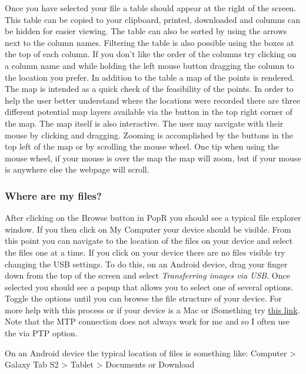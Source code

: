 \documentclass[
]{book}
\begin{document}
Once you have selected your file a table should appear at the right of the screen. This table can be copied to your clipboard, printed, downloaded and columns can be hidden for easier viewing. The table can also be sorted by using the arrows next to the column names. Filtering the table is also possible using the boxes at the top of each column. If you don't like the order of the columns try clicking on a column name and while holding the left mouse button dragging the column to the location you prefer. In addition to the table a map of the points is rendered. The map is intended as a quick check of the feasibility of the points. In order to help the user better understand where the locations were recorded there are three different potential map layers available via the button in the top right corner of the map. The map itself is also interactive. The user may navigate with their mouse by clicking and dragging. Zooming is accomplished by the buttons in the top left of the map or by scrolling the mouse wheel. One tip when using the mouse wheel, if your mouse is over the map the map will zoom, but if your mouse is anywhere else the webpage will scroll.

\hypertarget{where-are-my-files}{%
\subsubsection*{Where are my files?}\label{where-are-my-files}}

After clicking on the Browse button in PopR you should see a typical file explorer window. If you then click on My Computer your device should be visible. From this point you can navigate to the location of the files on your device and select the files one at a time. If you click on your device there are no files visible try changing the USB settings. To do this, on an Android device, drag your finger down from the top of the screen and select \emph{Transferring images via USB}. Once selected you should see a popup that allows you to select one of several options. Toggle the options until you can browse the file structure of your device. For more help with this process or if your device is a Mac or iSomething try \href{https://support.google.com/nexus/answer/2840804?hl=en}{this link}. Note that the MTP connection does not always work for me and so I often use the via PTP option.

On an Android device the typical location of files is something like:
Computer \textgreater{} Galaxy Tab S2 \textgreater{} Tablet \textgreater{} Documents or Download
\end{document}
